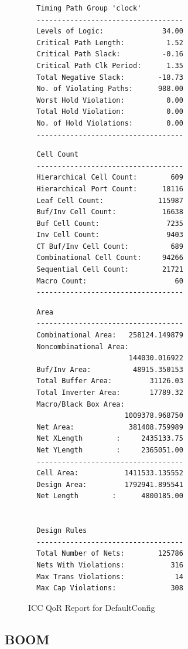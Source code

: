 \documentclass{article}
\begin{document}
\begin{figure}
\begin{multicols}{2}
\begin{verbatim}
  Timing Path Group 'clock'
  -----------------------------------
  Levels of Logic:              34.00
  Critical Path Length:          1.52
  Critical Path Slack:          -0.16
  Critical Path Clk Period:      1.35
  Total Negative Slack:        -18.73
  No. of Violating Paths:      988.00
  Worst Hold Violation:          0.00
  Total Hold Violation:          0.00
  No. of Hold Violations:        0.00
  -----------------------------------
\end{verbatim}

\begin{verbatim}
  Cell Count
  -----------------------------------
  Hierarchical Cell Count:        609
  Hierarchical Port Count:      18116
  Leaf Cell Count:             115987
  Buf/Inv Cell Count:           16638
  Buf Cell Count:                7235
  Inv Cell Count:                9403
  CT Buf/Inv Cell Count:          689
  Combinational Cell Count:     94266
  Sequential Cell Count:        21721
  Macro Count:                     60
  -----------------------------------
\end{verbatim}

\begin{verbatim}
  Area
  -----------------------------------
  Combinational Area:   258124.149879
  Noncombinational Area:
                        144030.016922
  Buf/Inv Area:          48915.350153
  Total Buffer Area:         31126.03
  Total Inverter Area:       17789.32
  Macro/Black Box Area:
                       1009378.968750
  Net Area:             381408.759989
  Net XLength        :     2435133.75
  Net YLength        :     2365051.00
  -----------------------------------
  Cell Area:           1411533.135552
  Design Area:         1792941.895541
  Net Length        :      4800185.00


  Design Rules
  -----------------------------------
  Total Number of Nets:        125786
  Nets With Violations:           316
  Max Trans Violations:            14
  Max Cap Violations:             308
\end{verbatim}
\end{multicols}
  \caption{ICC QoR Report for DefaultConfig}
  \label{res:rocket-qor}
\end{figure}

\subsection{BOOM}
\end{document}

